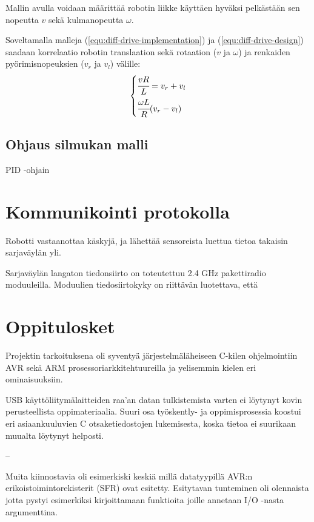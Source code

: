 \documentclass[]{article} %
\numberwithin{equation}{section}
\numberwithin{figure}{section}
\numberwithin{table}{section}
\begin{document}
Mallin avulla voidaan määrittää robotin liikke käyttäen hyväksi pelkästään sen nopeutta $v$ sekä kulmanopeutta $\omega$.

Soveltamalla malleja (\ref{equ:diff-drive-implementation}) ja (\ref{equ:diff-drive-design}) saadaan korrelaatio robotin translaation sekä rotaation ($v$ ja $\omega$) ja renkaiden pyörimisnopeuksien ($v_r$ ja $v_l$) välille:
\begin{align}
    \label{equ:diff-drive-correlation}
    \begin{dcases}
        \cfrac{vR}{L} = v_r + v_l\\
        \cfrac{\omega L }{R} (v_r - v_l) 
    \end{dcases}
\end{align}

\subsection{Ohjaus silmukan malli}
\label{sub:Ohjaus silmukan malli}

PID -ohjain


\section{Kommunikointi protokolla}
\label{sec:Kommunikointi protokilla}

Robotti vastaanottaa käskyjä, ja lähettää sensoreista luettua tietoa takaisin sarjaväylän yli.

Sarjaväylän langaton tiedonsiirto on toteutettuu 2.4 GHz pakettiradio moduuleilla.
Moduulien tiedosiirtokyky on riittävän luotettava, että 


\section{Oppitulosket}
\label{sec:Oppitulosket}

Projektin tarkoituksena oli syventyä järjestelmäläheiseen C-kilen ohjelmointiin AVR sekä ARM prosessoriarkkitehtuureilla ja yelisemmin kielen eri ominaisuuksiin.

USB käyttöliitymälaitteiden raa'an datan tulkistemista varten ei löytynyt kovin perusteellista oppimateriaalia.
Suuri osa työskently- ja oppimisprosessia koostui eri asiaankuuluvien C otsaketiedostojen lukemisesta, koska tietoa ei suurikaan muualta löytynyt helposti. 

--

Muita kiinnostavia oli esimerkiski keskiä millä datatyypillä AVR:n erikoistoimintorekisterit (SFR) ovat esitetty.
Esitytavan tunteminen oli olennaista jotta pystyi esimerkiksi kirjoittamaan funktioita joille annetaan I/O -nasta argumenttina.
\end{document}
